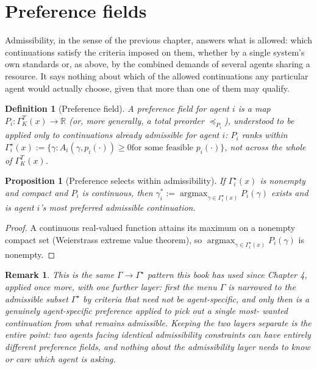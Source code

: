 \documentclass[11pt]{report}
\newtheorem{proposition}{Proposition}[chapter]
\newtheorem{definition}{Definition}[chapter]
\newtheorem{remark}{Remark}[chapter]
\begin{document}
\section*{Preference fields}

Admissibility, in the sense of the previous chapter, answers what is
allowed: which continuations satisfy the criteria imposed on them,
whether by a single system's own standards or, as above, by the
combined demands of several agents sharing a resource. It says
nothing about which of the allowed continuations any particular agent
would actually choose, given that more than one of them may qualify.

\begin{definition}[Preference field]
A preference field for agent $i$ is a map
$P_i : \Gamma_K^T(x) \to \mathbb{R}$ (or, more generally, a total
preorder $\preceq_{P_i}$), understood to be applied only to
continuations already admissible for agent $i$: $P_i$ ranks within
$\Gamma_i^\star(x) := \{\gamma : A_i(\gamma, p_i(\cdot)) \geq 0 \text{
for some feasible } p_i(\cdot)\}$, not across the whole of
$\Gamma_K^T(x)$.
\end{definition}

\begin{proposition}[Preference selects within admissibility]
If $\Gamma_i^\star(x)$ is nonempty and compact and $P_i$ is continuous,
then $\gamma_i^\ast := \operatorname{argmax}_{\gamma \in \Gamma_i^\star(x)} P_i(\gamma)$
exists and is agent $i$'s most preferred admissible continuation.
\end{proposition}
\begin{proof}
A continuous real-valued function attains its maximum on a nonempty
compact set (Weierstrass extreme value theorem), so
$\operatorname{argmax}_{\gamma \in \Gamma_i^\star(x)} P_i(\gamma)$ is
nonempty.
\end{proof}

\begin{remark}
This is the same $\Gamma \to \Gamma^\star$ pattern this book has used
since Chapter 4, applied once more, with one further layer: first the
menu $\Gamma$ is narrowed to the admissible subset $\Gamma^\star$ by
criteria that need not be agent-specific, and only then is a
genuinely agent-specific preference applied to pick out a single most-
wanted continuation from what remains admissible. Keeping the two
layers separate is the entire point: two agents facing identical
admissibility constraints can have entirely different preference
fields, and nothing about the admissibility layer needs to know or
care which agent is asking.
\end{remark}
\end{document}
